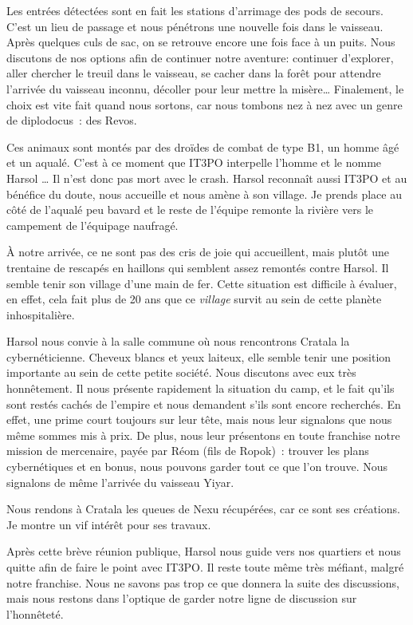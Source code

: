 \documentclass[a4paper,9pt,twoside,twocolumn,openany]{book}
\begin{document}
Les entrées détectées sont en fait les stations d’arrimage des pods de secours. C’est un lieu de passage et nous pénétrons une nouvelle fois dans le vaisseau. Après quelques culs de sac, on se retrouve encore une fois face à un puits. Nous discutons de nos options afin de continuer notre aventure: continuer d’explorer, aller chercher le treuil dans le vaisseau, se cacher dans la forêt pour attendre l’arrivée du vaisseau inconnu, décoller pour leur mettre la misère… Finalement, le choix est vite fait quand nous sortons, car nous tombons nez à nez avec un genre de diplodocus\ : des Revos.

Ces animaux sont montés par des droïdes de combat de type B1, un homme âgé et un aqualé. C’est à ce moment que IT3PO interpelle l’homme et le nomme Harsol … Il n’est donc pas mort avec le crash. Harsol reconnaît aussi IT3PO et au bénéfice du doute, nous accueille et nous amène à son village. Je prends place au côté de l’aqualé peu bavard et le reste de l’équipe remonte la rivière vers le campement de l’équipage naufragé.

À notre arrivée, ce ne sont pas des cris de joie qui accueillent, mais plutôt une trentaine de rescapés en haillons qui semblent assez remontés contre Harsol. Il semble tenir son village d’une main de fer. Cette situation est difficile à évaluer, en effet, cela fait plus de 20 ans que ce \emph{village} survit au sein de cette planète inhospitalière.

Harsol nous convie à la salle commune où nous rencontrons Cratala la cybernéticienne. Cheveux blancs et yeux laiteux, elle semble tenir une position importante au sein de cette petite société. Nous discutons avec eux très honnêtement. Il nous présente rapidement la situation du camp, et le fait qu’ils sont restés cachés de l’empire et nous demandent s’ils sont encore recherchés. En effet, une prime court toujours sur leur tête, mais nous leur signalons que nous même sommes mis à prix. De plus, nous leur présentons en toute franchise notre mission de mercenaire, payée par Réom (fils de Ropok)\ : trouver les plans cybernétiques et en bonus, nous pouvons garder tout ce que l’on trouve. Nous signalons de même l’arrivée du vaisseau Yiyar.

Nous rendons à Cratala les queues de Nexu récupérées, car ce sont ses créations. Je montre un vif intérêt pour ses travaux.

Après cette brève réunion publique, Harsol nous guide vers nos quartiers et nous quitte afin de faire le point avec IT3PO. Il reste toute même très méfiant, malgré notre franchise. Nous ne savons pas trop ce que donnera la suite des discussions, mais nous restons dans l’optique de garder notre ligne de discussion sur l’honnêteté.
\end{document}
